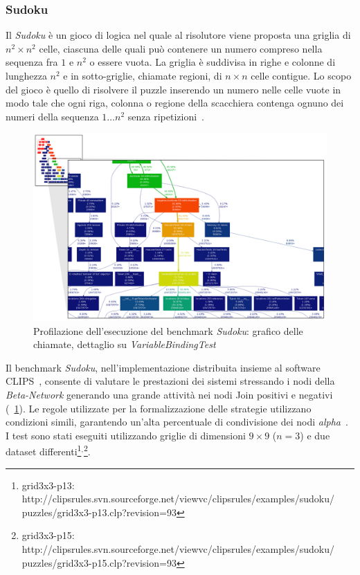 \subsubsection{Sudoku}

Il \emph{Sudoku} è un gioco di logica nel quale al risolutore viene proposta una griglia di $n^2 \times n^2$ celle, ciascuna delle quali può contenere un numero compreso nella sequenza fra $1$ e $n^2$ o essere vuota. La griglia è suddivisa in righe e colonne di lunghezza $n^2$ e in sotto-griglie, chiamate regioni, di $n \times n$ celle contigue. Lo scopo del gioco è quello di risolvere il puzzle inserendo un numero nelle celle vuote in modo tale che ogni riga, colonna o regione della scacchiera contenga ognuno dei numeri della sequenza $1 \dots n^2$ senza ripetizioni~\cite{sudokuwikipedia}.

\begin{figure}
\centering
\includegraphics[width=1.3\textwidth, angle=270, viewport=0 0 718 456]{Immagini/Capitolo3/Profile-sudoku.pdf}
\caption[Profilazione dell'esecuzione del benchmark \emph{Sudoku}]{Profilazione dell'esecuzione del benchmark \emph{Sudoku}: grafico delle chiamate, dettaglio su \emph{VariableBindingTest}}\label{fig:profile-sudoku}
\end{figure}


Il benchmark \emph{Sudoku}, nell'implementazione distribuita insieme al software CLIPS~\cite{clipssudoku}, consente di valutare le prestazioni dei sistemi stressando i nodi della \emph{Beta-Network} generando una grande attività nei nodi Join positivi e negativi (\figurename~\ref{fig:profile-sudoku}). Le regole utilizzate per la formalizzazione delle strategie utilizzano condizioni simili, garantendo un'alta percentuale di condivisione dei nodi \emph{alpha}~\cite{rbsbench}. I test sono stati eseguiti utilizzando griglie di dimensioni $9 \times 9$ ($n = 3$) e due dataset differenti\footnote{grid3x3-p13: http://clipsrules.svn.sourceforge.net/viewvc/clipsrules/examples/sudoku/ puzzles/grid3x3-p13.clp?revision=93}$^,$\footnote{grid3x3-p15: http://clipsrules.svn.sourceforge.net/viewvc/clipsrules/examples/sudoku/ puzzles/grid3x3-p15.clp?revision=93}.

